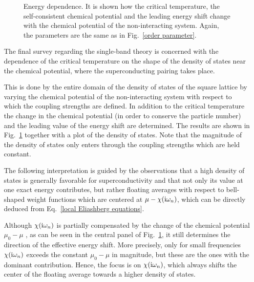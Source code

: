 \begin{figure}
    \small
    \centering
    
    
    
    \caption[Energy dependence]{
        Energy dependence. It is shown how the critical temperature, the
        self-consistent chemical potential and the leading energy shift change
        with the chemical potential of the non-interacting system. Again, the
        parameters are the same as in Fig.~\ref{order parameter}.}
    \label{energy dependence}
\end{figure}
%
The final survey regarding the single-band  theory is concerned
with the dependence of the critical temperature on the shape of the density of
states near the chemical potential, where the superconducting pairing takes
place.

This is done by  the entire domain of the density of states of the
square lattice by varying the chemical potential of the non-interacting system
with respect to which the coupling strengths are defined. In addition to the
critical temperature the change in the chemical potential (in order to conserve
the particle number) and the leading value of the energy shift are determined.
The results are shown in Fig.~\ref{energy dependence} together with a plot of
the density of states. Note that the magnitude of the density of states only
enters through the coupling strengths which are held constant.

The following interpretation is guided by the observations that a high density
of states is generally favorable for superconductivity and that not only its
value at one exact energy contributes, but rather floating averages with respect
to bell-shaped weight functions which are centered at $\mu - \chi(\mathrm i \omega_n)$,
which can be directly deduced from Eq.~\ref{local Eliashberg equations}.

Although $\chi(\mathrm i \omega_n)$ is partially compensated by the change of the
chemical potential $\mu_0 - \mu$ \cite[80]{AllenMitrovic82}, as can be seen in
the central panel of Fig.~\ref{energy dependence}, it still determines the
direction of the effective energy shift. More precisely, only for small
 frequencies $\chi(\mathrm i \omega_n)$ exceeds the constant $\mu_0 -
\mu$ in magnitude, but these are the ones with the dominant contribution. Hence,
the focus is on $\chi(\mathrm i \omega_n)$, which always shifts the center of the
floating average towards a higher density of states.

